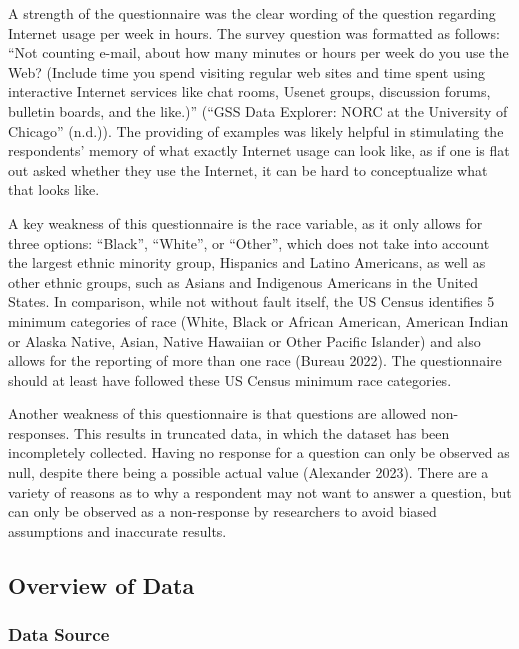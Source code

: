 \documentclass[
]{article}
\begin{document}
A strength of the questionnaire was the clear wording of the question
regarding Internet usage per week in hours. The survey question was
formatted as follows: ``Not counting e-mail, about how many minutes or
hours per week do you use the Web? (Include time you spend visiting
regular web sites and time spent using interactive Internet services
like chat rooms, Usenet groups, discussion forums, bulletin boards, and
the like.)'' ({``GSS Data Explorer: NORC at the University of Chicago''}
(n.d.)). The providing of examples was likely helpful in stimulating the
respondents' memory of what exactly Internet usage can look like, as if
one is flat out asked whether they use the Internet, it can be hard to
conceptualize what that looks like.

A key weakness of this questionnaire is the race variable, as it only
allows for three options: ``Black'', ``White'', or ``Other'', which does
not take into account the largest ethnic minority group, Hispanics and
Latino Americans, as well as other ethnic groups, such as Asians and
Indigenous Americans in the United States. In comparison, while not
without fault itself, the US Census identifies 5 minimum categories of
race (White, Black or African American, American Indian or Alaska
Native, Asian, Native Hawaiian or Other Pacific Islander) and also
allows for the reporting of more than one race (Bureau 2022). The
questionnaire should at least have followed these US Census minimum race
categories.

Another weakness of this questionnaire is that questions are allowed
non-responses. This results in truncated data, in which the dataset has
been incompletely collected. Having no response for a question can only
be observed as null, despite there being a possible actual value
(Alexander 2023). There are a variety of reasons as to why a respondent
may not want to answer a question, but can only be observed as a
non-response by researchers to avoid biased assumptions and inaccurate
results.

\hypertarget{overview-of-data}{%
\subsection{Overview of Data}\label{overview-of-data}}

\hypertarget{data-source}{%
\subsubsection{Data Source}\label{data-source}}
\end{document}
